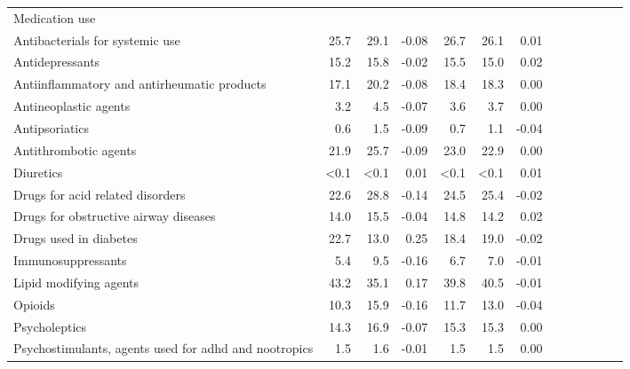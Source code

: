 \documentclass[11pt,]{article}
\begin{document}
\begin{longtable}{lrrrrrrrrrrrr}
  Medication use &    &    &     &    &    &     \\ 
      Antibacterials for systemic use & 25.7 & 29.1 & -0.08 & 26.7 & 26.1 &  0.01 \\ 
      Antidepressants & 15.2 & 15.8 & -0.02 & 15.5 & 15.0 &  0.02 \\ 
      Antiinflammatory and antirheumatic products & 17.1 & 20.2 & -0.08 & 18.4 & 18.3 &  0.00 \\ 
      Antineoplastic agents &  3.2 &  4.5 & -0.07 &  3.6 &  3.7 &  0.00 \\ 
      Antipsoriatics &  0.6 &  1.5 & -0.09 &  0.7 &  1.1 & -0.04 \\ 
      Antithrombotic agents & 21.9 & 25.7 & -0.09 & 23.0 & 22.9 &  0.00 \\ 
      Diuretics & <0.1 & <0.1 &  0.01 & <0.1 & <0.1 &  0.01 \\ 
      Drugs for acid related disorders & 22.6 & 28.8 & -0.14 & 24.5 & 25.4 & -0.02 \\ 
      Drugs for obstructive airway diseases & 14.0 & 15.5 & -0.04 & 14.8 & 14.2 &  0.02 \\ 
      Drugs used in diabetes & 22.7 & 13.0 &  0.25 & 18.4 & 19.0 & -0.02 \\ 
      Immunosuppressants &  5.4 &  9.5 & -0.16 &  6.7 &  7.0 & -0.01 \\ 
      Lipid modifying agents & 43.2 & 35.1 &  0.17 & 39.8 & 40.5 & -0.01 \\ 
      Opioids & 10.3 & 15.9 & -0.16 & 11.7 & 13.0 & -0.04 \\ 
      Psycholeptics & 14.3 & 16.9 & -0.07 & 15.3 & 15.3 &  0.00 \\ 
      Psychostimulants, agents used for adhd and nootropics &  1.5 &  1.6 & -0.01 &  1.5 &  1.5 &  0.00 \\ 
   \bottomrule\end{longtable}
\clearpage
{}
\end{document}
